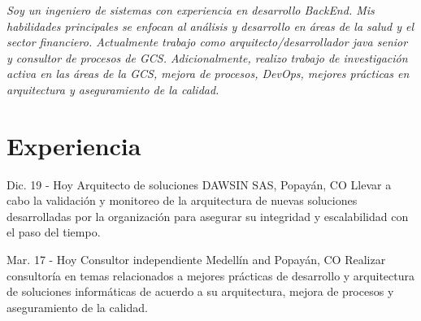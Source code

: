 \documentclass[]{cv-class}
\begin{document}
\justifying
	\begin{small}
\textit{
    Soy un ingeniero de sistemas con experiencia en desarrollo BackEnd. Mis habilidades principales se enfocan al análisis y desarrollo en áreas de la salud y el sector financiero. Actualmente trabajo como arquitecto/desarrollador java senior y consultor de procesos de GCS. Adicionalmente, realizo trabajo de investigación activa en las áreas de la GCS, mejora de procesos, DevOps, mejores prácticas en arquitectura y aseguramiento de la calidad.}
	\end{small}

\section{Experiencia}
\begin{entrylist}
	\entry
	{Dic. 19 - Hoy}
	{Arquitecto de soluciones}
	{DAWSIN SAS, Popayán, CO}
	{Llevar a cabo la validación y monitoreo de la arquitectura de nuevas soluciones desarrolladas por la organización para asegurar su integridad y escalabilidad con el paso del tiempo.}

	\entry
	{Mar. 17 - Hoy}
	{Consultor independiente}
	{Medellín and Popayán, CO}
	{Realizar consultoría en temas relacionados a mejores prácticas de desarrollo y arquitectura de soluciones informáticas de acuerdo a su arquitectura, mejora de procesos y aseguramiento de la calidad.}
	  

\end{entrylist}
\end{document}
